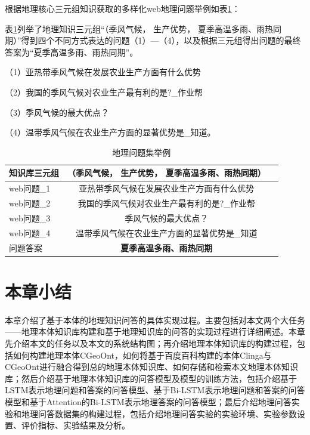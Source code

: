 根据地理核心三元组知识获取的多样化web地理问题举例如表\ref{tab:qa_dataset}：

表\ref{tab:qa_dataset}列举了地理知识三元组“（季风气候， 生产优势， 夏季高温多雨、雨热同期）”得到四个不同方式表达的问题（1）—（4），以及根据三元组得出问题的最终答案为“夏季高温多雨、雨热同期”。

（1）亚热带季风气候在发展农业生产方面有什么优势

（2）我国的季风气候对农业生产最有利的是?\_作业帮

（3）季风气候的最大优点？

（4）温带季风气候在农业生产方面的显著优势是\_知道。

\begin{table}[htbp] 
	\centering
	\caption{\label{tab:qa_dataset}地理问题集举例} 
	\begin{tabular}{lcl}
		\toprule 
		知识库三元组	& \textbf{（季风气候， 生产优势， 夏季高温多雨、雨热同期）}\\
		\midrule 
		web问题\_1 & 亚热带季风气候在发展农业生产方面有什么优势 \\ 
		web问题\_2 & 我国的季风气候对农业生产最有利的是?\_作业帮 \\ 
		web问题\_3 & 季风气候的最大优点？ \\
		web问题\_4 & 温带季风气候在农业生产方面的显著优势是\_知道 \\
		\midrule
		问题答案 & \textbf{夏季高温多雨、雨热同期}\\ 
		\bottomrule 
	\end{tabular} 
\end{table}



\section{本章小结}
本章介绍了基于本体的地理知识问答的具体实现过程。主要包括对本文两个大任务——地理本体知识库构建和基于地理知识库的问答的实现过程进行详细阐述。本章先介绍本文的任务以及本文的系统结构图；再介绍地理本体知识库的构建过程，包括如何构建地理本体CGeoOnt，如何将基于百度百科构建的本体Clinga与CGeoOnt进行融合得到总的地理本体知识库、如何存储和检索本文地理本体知识库；然后介绍基于地理本体知识库的问答模型及模型的训练方法，包括介绍基于LSTM表示地理问题和答案的问答模型、基于Bi-LSTM表示地理问题和答案的问答模型和基于Attention的Bi-LSTM表示地理答案的问答模型；最后介绍地理问答实验和地理问答数据集的构建过程，包括介绍地理问答实验的实验环境、实验参数设置、评价指标、实验结果及分析。
